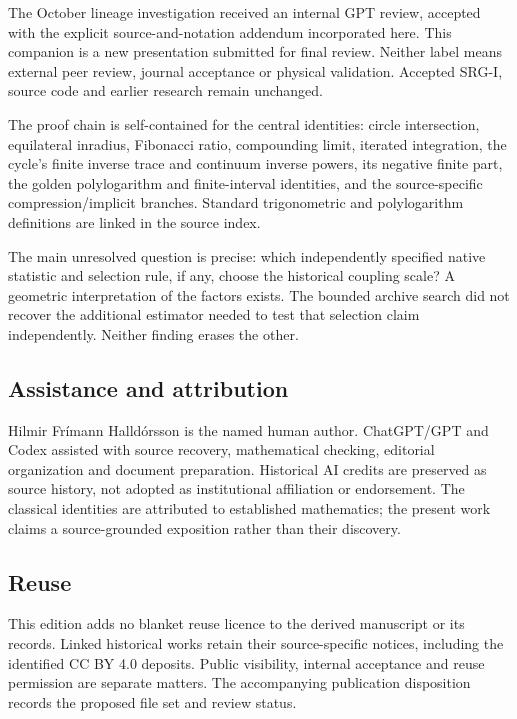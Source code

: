 \documentclass[11pt,a4paper]{article}
\begin{document}
The October lineage investigation received an internal GPT review, accepted with the explicit source-and-notation addendum incorporated here. This companion is a new presentation submitted for final review. Neither label means external peer review, journal acceptance or physical validation. Accepted SRG-I, source code and earlier research remain unchanged.


The proof chain is self-contained for the central identities: circle intersection, equilateral inradius, Fibonacci ratio, compounding limit, iterated integration, the cycle's finite inverse trace and continuum inverse powers, its negative finite part, the golden polylogarithm and finite-interval identities, and the source-specific compression/implicit branches. Standard trigonometric and polylogarithm definitions are linked in the source index.


The main unresolved question is precise: which independently specified native statistic and selection rule, if any, choose the historical coupling scale? A geometric interpretation of the factors exists. The bounded archive search did not recover the additional estimator needed to test that selection claim independently. Neither finding erases the other.


\subsection*{Assistance and attribution}

Hilmir Frímann Halldórsson is the named human author. ChatGPT/GPT and Codex assisted with source recovery, mathematical checking, editorial organization and document preparation. Historical AI credits are preserved as source history, not adopted as institutional affiliation or endorsement. The classical identities are attributed to established mathematics; the present work claims a source-grounded exposition rather than their discovery.


\subsection*{Reuse}

This edition adds no blanket reuse licence to the derived manuscript or its records. Linked historical works retain their source-specific notices, including the identified CC BY 4.0 deposits. Public visibility, internal acceptance and reuse permission are separate matters. The accompanying publication disposition records the proposed file set and review status.
\end{document}
